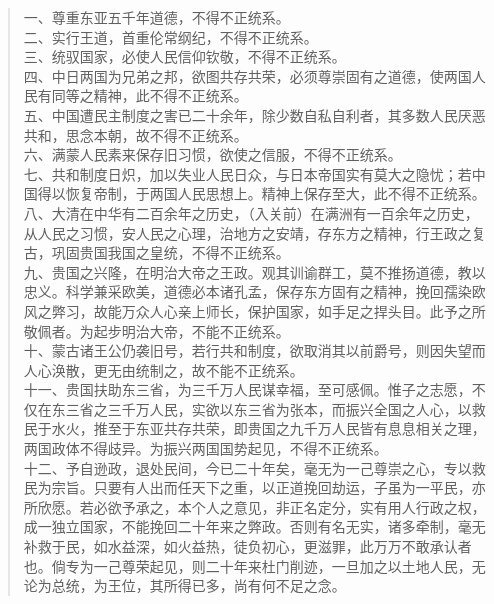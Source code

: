 \begin{quote}
	一、尊重东亚五千年道德，不得不正统系。\\

二、实行王道，首重伦常纲纪，不得不正统系。\\

三、统驭国家，必使人民信仰钦敬，不得不正统系。\\

四、中日两国为兄弟之邦，欲图共存共荣，必须尊崇固有之道德，使两国人民有同等之精神，此不得不正统系。\\

五、中国遭民主制度之害已二十余年，除少数自私自利者，其多数人民厌恶共和，思念本朝，故不得不正统系。\\

六、满蒙人民素来保存旧习惯，欲使之信服，不得不正统系。\\

七、共和制度日炽，加以失业人民日众，与日本帝国实有莫大之隐忧；若中国得以恢复帝制，于两国人民思想上。精神上保存至大，此不得不正统系。\\

八、大清在中华有二百余年之历史，（入关前）在满洲有一百余年之历史，从人民之习惯，安人民之心理，治地方之安靖，存东方之精神，行王政之复古，巩固贵国我国之皇统，不得不正统系。\\

九、贵国之兴隆，在明治大帝之王政。观其训谕群工，莫不推扬道德，教以忠义。科学兼采欧美，道德必本诸孔孟，保存东方固有之精神，挽回孺染欧风之弊习，故能万众人心亲上师长，保护国家，如手足之捍头目。此予之所敬佩者。为起步明治大帝，不能不正统系。\\

十、蒙古诸王公仍袭旧号，若行共和制度，欲取消其以前爵号，则因失望而人心涣散，更无由统制之，故不能不正统系。\\

十一、贵国扶助东三省，为三千万人民谋幸福，至可感佩。惟子之志愿，不仅在东三省之三千万人民，实欲以东三省为张本，而振兴全国之人心，以救民于水火，推至于东亚共存共荣，即贵国之九千万人民皆有息息相关之理，两国政体不得歧异。为振兴两国国势起见，不得不正统系。\\

十二、予自逊政，退处民间，今已二十年矣，毫无为一己尊崇之心，专以救民为宗旨。只要有人出而任天下之重，以正道挽回劫运，子虽为一平民，亦所欣愿。若必欲予承之，本个人之意见，非正名定分，实有用人行政之权，成一独立国家，不能挽回二十年来之弊政。否则有名无实，诸多牵制，毫无补救于民，如水益深，如火益热，徒负初心，更滋罪，此万万不敢承认者也。倘专为一己尊荣起见，则二十年来杜门削迹，一旦加之以土地人民，无论为总统，为王位，其所得已多，尚有何不足之念。\\
\end{quote}

